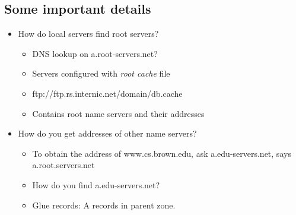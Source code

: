 \subsection{Some important details}
\begin{itemize}[nosep]
    \item How do local servers find root servers?
          \begin{itemize}[nosep]
              \item DNS lookup on a.root-servers.net?
              \item Servers configured with \emph{root cache} file
              \item ftp://ftp.rs.internic.net/domain/db.cache
              \item Contains root name servers and their addresses
          \end{itemize}
    \item How do you get addresses of other name servers?
          \begin{itemize}[nosep]
              \item To obtain the address of www.cs.brown.edu, ask a.edu-servers.net, says a.root.servers.net
              \item How do you find a.edu-servers.net?
              \item Glue records: A records in parent zone.
          \end{itemize}
\end{itemize}